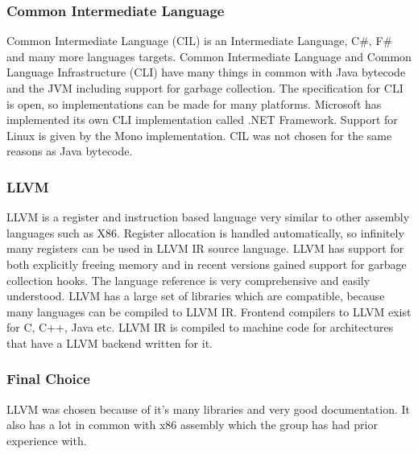 \subsubsection{Common Intermediate Language}
Common Intermediate Language (CIL) is an Intermediate Language, C\#, F\# and many more languages targets. Common Intermediate Language and Common Language Infrastructure (CLI) have many things in common with Java bytecode and the JVM including support for garbage collection. The specification for CLI is open, so implementations can be made for many platforms. Microsoft has implemented its own CLI implementation called .NET Framework. Support for Linux is given by the Mono implementation. CIL was not chosen for the same reasons as Java bytecode.

\subsubsection{LLVM}
LLVM is a register and instruction based language very similar to other assembly languages such as X86. Register allocation is handled automatically, so infinitely many registers can be used in LLVM IR source language. LLVM has support for both explicitly freeing memory and in recent versions gained support for garbage collection hooks. The language reference is very comprehensive and easily understood. LLVM has a large set of libraries which are compatible, because many languages can be compiled to LLVM IR. Frontend compilers to LLVM exist for C, C++, Java etc. LLVM IR is compiled to machine code for architectures that have a LLVM backend written for it.

\subsubsection{Final Choice}
LLVM was chosen because of it’s many libraries and very good documentation. It also has a lot in common with x86 assembly which the group has had prior experience with.
